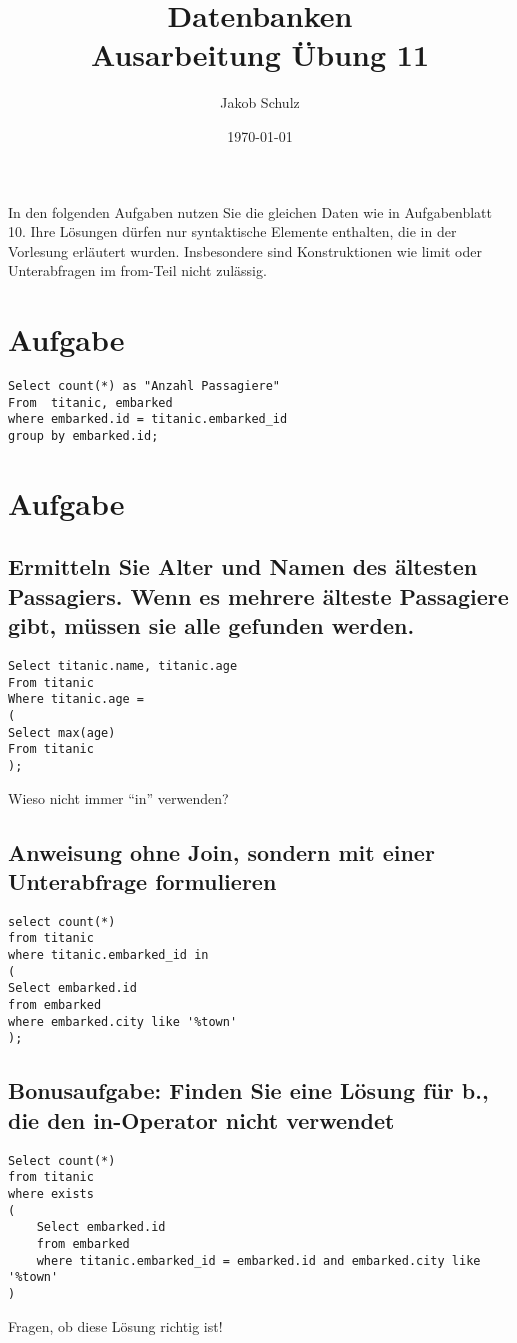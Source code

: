 \documentclass[a4paper, 11pt, titlepage]{article}
\begin{document}
\title{Datenbanken \\
Ausarbeitung \"Ubung 11}

\author{Jakob Schulz}

\date{\today}

\maketitle{\thispagestyle{plain}}
\noindent In den folgenden Aufgaben nutzen Sie die gleichen Daten wie in Aufgabenblatt 10. Ihre Lösungen 
dürfen nur syntaktische Elemente enthalten, die in der Vorlesung erläutert wurden. Insbesondere 
sind Konstruktionen wie limit oder Unterabfragen im from-Teil nicht zulässig.
\section{Aufgabe}
\begin{lstlisting}[style = sql]
Select count(*) as "Anzahl Passagiere"
From  titanic, embarked
where embarked.id = titanic.embarked_id
group by embarked.id;
\end{lstlisting}
\section{Aufgabe}
\subsection{Ermitteln Sie Alter und Namen des ältesten Passagiers. Wenn es mehrere älteste Passagiere 
gibt, müssen sie alle gefunden werden.}
\begin{lstlisting}[style = sql]
Select titanic.name, titanic.age
From titanic
Where titanic.age = 
(
Select max(age)
From titanic
);
\end{lstlisting}
Wieso nicht immer "`in"' verwenden?
\subsection{Anweisung ohne Join, sondern mit einer Unterabfrage formulieren}
\begin{lstlisting}[style = sql]
select count(*)
from titanic 
where titanic.embarked_id in 
(
Select embarked.id
from embarked
where embarked.city like '%town'
);
\end{lstlisting}
\subsection{Bonusaufgabe: Finden Sie eine Lösung für b., die den in-Operator nicht verwendet}
\begin{lstlisting}[style = sql]
Select count(*)
from titanic
where exists
(
	Select embarked.id
	from embarked
	where titanic.embarked_id = embarked.id and embarked.city like '%town'
)
\end{lstlisting}
Fragen, ob diese Lösung richtig ist!
\end{document}
